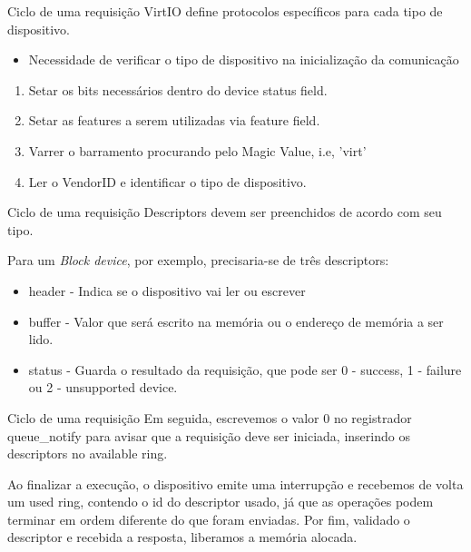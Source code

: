 \documentclass[brazil,nolapesd,aspectratio=169,noartschool]{lapesd-slides}
\begin{document}
\begin{frame}{Ciclo de uma requisição}
	VirtIO define protocolos específicos para cada tipo de dispositivo.
	\begin{itemize}
		\item Necessidade de verificar o tipo de dispositivo na inicialização da comunicação
	\end{itemize}

	\vspace{1em}

	\begin{enumerate}
		\item Setar os bits necessários dentro do device status field.
		\item Setar as features a serem utilizadas via feature field.
		\item Varrer o barramento procurando pelo Magic Value, i.e, 'virt'
		\item Ler o VendorID e identificar o tipo de dispositivo.
	\end{enumerate}
\end{frame}

\begin{frame}{Ciclo de uma requisição}
	Descriptors devem ser preenchidos de acordo com seu tipo.
	
	\vspace{1em}

	Para um \textit{Block device}, por exemplo, precisaria-se de três descriptors:
	\begin{itemize}
		\item header - Indica se o dispositivo vai ler ou escrever
		\item buffer - Valor que será escrito na memória ou o endereço de memória a ser lido.
		\item status - Guarda o resultado da requisição, que pode ser 0 - success, 1 - failure ou 2 - unsupported device.
	\end{itemize}
\end{frame}

\begin{frame}{Ciclo de uma requisição}
	Em seguida, escrevemos o valor 0 no registrador queue{\_}notify para avisar que a requisição deve ser
	iniciada, inserindo os descriptors no available ring.

	\vspace{1em}

	Ao finalizar a execução, o dispositivo emite uma interrupção e recebemos de volta um used ring,
	contendo o id do descriptor usado, já que as operações podem terminar em ordem diferente do que
	foram enviadas. Por fim, validado o descriptor e recebida a resposta, liberamos a memória alocada.

\end{frame}


\thanksframe

\nocite{RISCVUserISA}
\nocite{virtioPaper}
\nocite{virtioManual}

\end{document}
